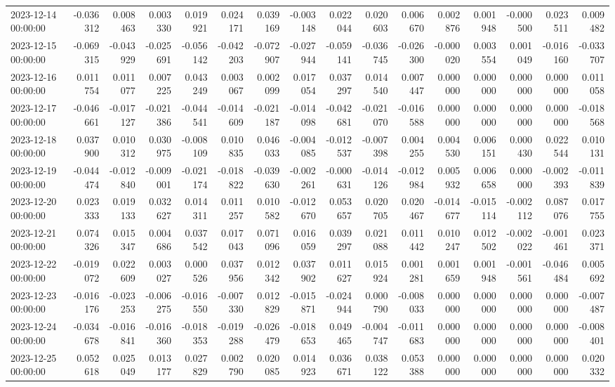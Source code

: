\begin{tabular}{lrrrrrrrrrrrrrrr}
2023-12-14 00:00:00 & -0.036312 & 0.008463 & 0.003330 & 0.019921 & 0.024171 & 0.039169 & -0.003148 & 0.022044 & 0.020603 & 0.006670 & 0.002876 & 0.001948 & -0.000500 & 0.023511 & 0.009482 \\
2023-12-15 00:00:00 & -0.069315 & -0.043929 & -0.025691 & -0.056142 & -0.042203 & -0.072907 & -0.027944 & -0.059141 & -0.036745 & -0.026300 & -0.000020 & 0.003554 & 0.001049 & -0.016160 & -0.033707 \\
2023-12-16 00:00:00 & 0.011754 & 0.011077 & 0.007225 & 0.043249 & 0.003067 & 0.002099 & 0.017054 & 0.037297 & 0.014540 & 0.007447 & 0.000000 & 0.000000 & 0.000000 & 0.000000 & 0.011058 \\
2023-12-17 00:00:00 & -0.046661 & -0.017127 & -0.021386 & -0.044541 & -0.014609 & -0.021187 & -0.014098 & -0.042681 & -0.021070 & -0.016588 & 0.000000 & 0.000000 & 0.000000 & 0.000000 & -0.018568 \\
2023-12-18 00:00:00 & 0.037900 & 0.010312 & 0.030975 & -0.008109 & 0.010835 & 0.046033 & -0.004085 & -0.012537 & -0.007398 & 0.004255 & 0.004530 & 0.006151 & 0.000430 & 0.022544 & 0.010131 \\
2023-12-19 00:00:00 & -0.044474 & -0.012840 & -0.009001 & -0.021174 & -0.018822 & -0.039630 & -0.002261 & -0.000631 & -0.014126 & -0.012984 & 0.005932 & 0.006658 & 0.000000 & -0.002393 & -0.011839 \\
2023-12-20 00:00:00 & 0.023333 & 0.019133 & 0.032627 & 0.014311 & 0.011257 & 0.010582 & -0.012670 & 0.053657 & 0.020705 & 0.020467 & -0.014677 & -0.015114 & -0.002112 & 0.087076 & 0.017755 \\
2023-12-21 00:00:00 & 0.074326 & 0.015347 & 0.004686 & 0.037542 & 0.017043 & 0.071096 & 0.016059 & 0.039297 & 0.021088 & 0.011442 & 0.010247 & 0.012502 & -0.002022 & -0.001461 & 0.023371 \\
2023-12-22 00:00:00 & -0.019072 & 0.022609 & 0.003027 & 0.000526 & 0.037956 & 0.012342 & 0.037902 & 0.011627 & 0.015924 & 0.001281 & 0.001659 & 0.001948 & -0.001561 & -0.046484 & 0.005692 \\
2023-12-23 00:00:00 & -0.016176 & -0.023253 & -0.006275 & -0.016550 & -0.007330 & 0.012829 & -0.015871 & -0.024944 & 0.000790 & -0.008033 & 0.000000 & 0.000000 & 0.000000 & 0.000000 & -0.007487 \\
2023-12-24 00:00:00 & -0.034678 & -0.016841 & -0.016360 & -0.018353 & -0.019288 & -0.026479 & -0.018653 & 0.049465 & -0.004747 & -0.011683 & 0.000000 & 0.000000 & 0.000000 & 0.000000 & -0.008401 \\
2023-12-25 00:00:00 & 0.052618 & 0.025049 & 0.013177 & 0.027829 & 0.002790 & 0.020085 & 0.014923 & 0.036671 & 0.038122 & 0.053388 & 0.000000 & 0.000000 & 0.000000 & 0.000000 & 0.020332 \\

\end{tabular}
